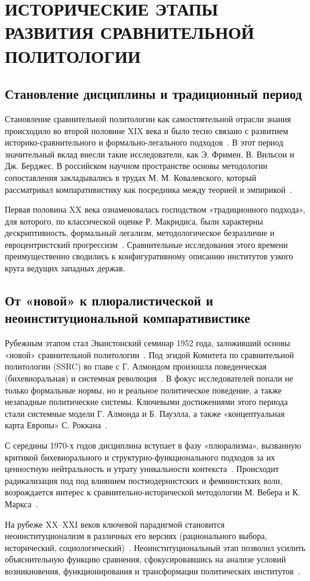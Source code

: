 \section{ИСТОРИЧЕСКИЕ ЭТАПЫ РАЗВИТИЯ СРАВНИТЕЛЬНОЙ ПОЛИТОЛОГИИ}

\subsection{Становление дисциплины и традиционный период}
Становление сравнительной политологии как самостоятельной отрасли знания происходило во второй половине XIX века и было тесно связано с развитием историко-сравнительного и формально-легального подходов~\cite{smorgunov2012}. В этот период значительный вклад внесли такие исследователи, как Э. Фримен, В. Вильсон и Дж. Берджес. В российском научном пространстве основы методологии сопоставления закладывались в трудах М. М. Ковалевского, который рассматривал компаративистику как посредника между теорией и эмпирикой~\cite{smorgunov2012}.

Первая половина XX века ознаменовалась господством «традиционного подхода», для которого, по классической оценке Р. Макридиса, были характерны дескриптивность, формальный легализм, методологическое безразличие и евроцентристский прогрессизм~\cite{smorgunov2012}. Сравнительные исследования этого времени преимущественно сводились к конфигуративному описанию институтов узкого круга ведущих западных держав.

\subsection{От «новой» к плюралистической и неоинституциональной компаративистике}
Рубежным этапом стал Эванстонский семинар 1952 года, заложивший основы «новой» сравнительной политологии~\cite{smorgunov2012}. Под эгидой Комитета по сравнительной политологии (SSRC) во главе с Г. Алмондом произошла поведенческая (бихевиоральная) и системная революция~\cite{smorgunov2012}. В фокус исследователей попали не только формальные нормы, но и реальное политическое поведение, а также незападные политические системы. Ключевыми достижениями этого периода стали системные модели Г. Алмонда и Б. Пауэлла, а также «концептуальная карта Европы» С. Роккана~\cite{smorgunov2012}.

С середины 1970-х годов дисциплина вступает в фазу «плюрализма», вызванную критикой бихевиорального и структурно-функционального подходов за их ценностную нейтральность и утрату уникальности контекста~\cite{smorgunov2012}. Происходит радикализация под под влиянием постмодернистских и феминистских волн, возрождается интерес к сравнительно-исторической методологии М. Вебера и К. Маркса~\cite{smorgunov2012}.

На рубеже XX--XXI веков ключевой парадигмой становится неоинституционализм в различных его версиях (рационального выбора, исторический, социологический)~\cite{smorgunov2012}. Неоинституциональный этап позволил усилить объяснительную функцию сравнения, сфокусировавшись на анализе условий возникновения, функционирования и трансформации политических институтов~\cite{smorgunov2012}.